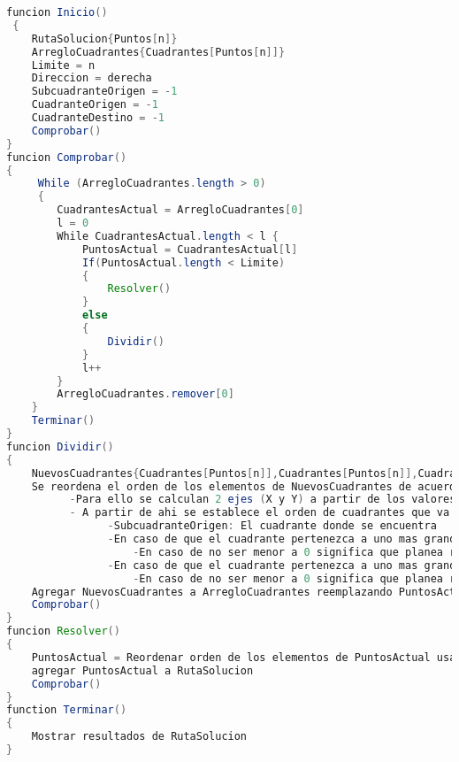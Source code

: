 \begin{lstlisting}[language=JAVA, caption=Algoritmo Base del Método de Cuadrantes, label=lst:codigo11,escapechar=|]
funcion Inicio()
 {
	RutaSolucion{Puntos[n]}
	ArregloCuadrantes{Cuadrantes[Puntos[n]]}
	Limite = n
	Direccion = derecha
	SubcuadranteOrigen = -1
	CuadranteOrigen = -1
	CuadranteDestino = -1
	Comprobar()
}
funcion Comprobar()
{
	 While (ArregloCuadrantes.length > 0)
	 {
		CuadrantesActual = ArregloCuadrantes[0]
		l = 0
		While CuadrantesActual.length < l {
			PuntosActual = CuadrantesActual[l]
			If(PuntosActual.length < Limite)
			{
				Resolver()
			} 
			else 
			{
				Dividir()  
			}
			l++
		} 
		ArregloCuadrantes.remover[0]
	}
	Terminar()
}	
funcion Dividir()
{
	NuevosCuadrantes{Cuadrantes[Puntos[n]],Cuadrantes[Puntos[n]],Cuadrantes[Puntos[n]],Cuadrantes[Puntos[n]]} = Dividir PuntosActual en 4
	Se reordena el orden de los elementos de NuevosCuadrantes de acuerdo al automata de cuadrantes de la figura \ref {fig:automata.png}
		  -Para ello se calculan 2 ejes (X y Y) a partir de los valores que forman los puntos de ese cuadrante, de ahi se establece el centro que es igual a los valores divididos en 2
		  - A partir de ahi se establece el orden de cuadrantes que va a recorrer para completar la ruta basandose en
				-SubcuadranteOrigen: El cuadrante donde se encuentra
				-En caso de que el cuadrante pertenezca a uno mas grande, el cuadrante al que planea dirigirse el cuadrante padre
					-En caso de no ser menor a 0 significa que planea regresar a si mismo, por tanto puede viajar a direccion, izquierda,derecha,arriba o abajo (por preferencia se eligio izquierda), en el automata de la figura |\ref {fig:automata.png}| se interpretara como estado |$\lambda$|                    
				-En caso de que el cuadrante pertenezca a uno mas grande, el numero de cuadrante padre al que pertenece
					-En caso de no ser menor a 0 significa que planea regresar a si mismo, por tanto puede viajar a dirección, izquierda,derecha,arriba o abajo (por preferencia se eligio izquierda), en el automata de la figura |\ref {fig:automata.png}| se interpretara como estado |$\lambda$|       
	Agregar NuevosCuadrantes a ArregloCuadrantes reemplazando PuntosActual en el mismo lugar donde estaban
	Comprobar()	
}
funcion Resolver()
{
	PuntosActual = Reordenar orden de los elementos de PuntosActual usando metodo de Fuerza Bruta probando todas las combinaciones posibles y obtener el mejor resultado
	agregar PuntosActual a RutaSolucion
	Comprobar()
}
function Terminar()
{
	Mostrar resultados de RutaSolucion
}	
\end{lstlisting}  